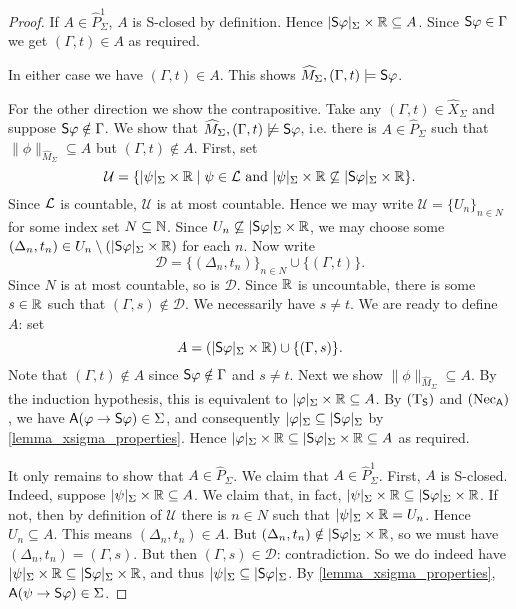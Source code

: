 \begin{proof}
    If $A \in \widehat{P}_\Sigma^1$, $A$ is S-closed by definition.  Hence
    $|\S\phi|_\Sigma \times \R \subseteq A$. Since $\S\phi \in \Gamma$ we get
    $(\Gamma, t) \in A$ as required.

    In either case we have $(\Gamma, t) \in A$. This shows $\widehat{M}_\Sigma,
    (\Gamma, t) \models \S\phi$.

    For the other direction we show the contrapositive. Take any $(\Gamma, t)
    \in \widehat{X}_\Sigma$ and suppose $\S\phi \notin \Gamma$. We show that
    $\widehat{M}_\Sigma, (\Gamma, t) \not\models \S\phi$, i.e. there is $A \in
    \widehat{P}_\Sigma$ such that $\|\phi\|_{\widehat{M}_\Sigma} \subseteq A$
    but $(\Gamma, t) \notin A$.
    First, set
    \[
        \mathcal{U} = \{
        |\psi|_\Sigma \times \R
        \mid
        \psi \in \cL \text{ and }
        |\psi|_\Sigma \times \R \not\subseteq |\S\phi|_\Sigma \times \R
        \}.
    \]
    Since $\cL$ is countable, $\mathcal{U}$ is at most countable.
    Hence we may write $\mathcal{U} = \{U_n\}_{n \in N}$ for some
    index set $N \subseteq \N$. Since $U_n \not\subseteq
    |\S\phi|_\Sigma \times \R$, we may choose some $(\Delta_n, t_n)
    \in U_n \setminus (|\S\phi|_\Sigma \times \R)$ for each $n$. Now
    write
    \[
      \mathcal{D} = \{(\Delta_n, t_n)\}_{n \in N} \cup \{(\Gamma,
      t)\}.
    \]
    Since $N$ is at most countable, so is $\mathcal{D}$.  Since
    $\R$ is uncountable, there is some $s \in \R$ such that $(\Gamma,
    s) \notin \mathcal{D}$. We necessarily have $s \ne t$. We are ready to
    define $A$: set
    \[
      A = (|\S\phi|_\Sigma \times \R) \cup \{(\Gamma, s)\}.
    \]
    Note that $(\Gamma, t) \notin A$ since $\S\phi \notin \Gamma$ and
    $s \ne t$.
    Next we show $\|\phi\|_{\widehat{M}_\Sigma} \subseteq A$. By the
    induction hypothesis, this is equivalent to $|\phi|_\Sigma \times
    \R \subseteq A$. By $\Tsoundness$ and $\necuniv$, we have
    $\A(\phi \limplies \S\phi) \in \Sigma$, and consequently
    $|\phi|_\Sigma \subseteq |\S\phi|_\Sigma$ by
    \cref{lemma_xsigma_properties}. Hence $|\phi|_\Sigma \times \R
    \subseteq |\S\phi|_\Sigma \times \R \subseteq A$ as required.

    It only remains to show that $A \in \widehat{P}_\Sigma$. We claim
    that $A \in \widehat{P}_\Sigma^1$. First, $A$ is S-closed.
    Indeed, suppose $|\psi|_\Sigma \times \R \subseteq A$. We claim
    that, in fact, $|\psi|_\Sigma \times \R \subseteq |\S\phi|_\Sigma
    \times \R$. If not, then by definition of $\mathcal{U}$ there is
    $n \in N$ such that $|\psi|_\Sigma \times \R = U_n$.  Hence $U_n
    \subseteq A$. This means $(\Delta_n, t_n) \in A$. But
    $(\Delta_n, t_n) \notin |\S\phi|_\Sigma \times \R$, so we must
    have $(\Delta_n, t_n) = (\Gamma, s)$. But then $(\Gamma, s) \in
    \mathcal{D}$: contradiction. So we do indeed have $|\psi|_\Sigma
    \times \R \subseteq |\S\phi|_\Sigma \times \R$, and thus
    $|\psi|_\Sigma \subseteq |\S\phi|_\Sigma$. By
    \cref{lemma_xsigma_properties}, $\A(\psi \limplies \S\phi) \in
    \Sigma$.


\end{proof}
